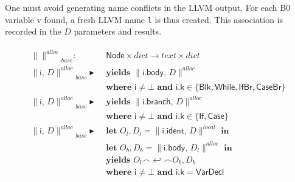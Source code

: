 \documentclass{article}
\newcommand{\trad}[2]{\ensuremath{\lVert \textsf{#1} \rVert^{\textit{#2}}}}
\newcommand{\nl}[0]{\ensuremath{\hookleftarrow}}
\DeclareMathOperator{\conc}{\smallfrown}
\DeclareMathOperator{\isdef}{\blacktriangleright}
\begin{document}
One must avoid generating name conflicts in the LLVM output. For each
B0 variable \textsf{v} found, a fresh LLVM name \texttt{l} is thus
created. This association is recorded in the $D$ parameters and results.
\begin{framed}
  \begin{align}
\begin{split}
    \trad{}{alloc}_{base} : & \textsf{ Node} \times dict \rightarrow text \times dict \\
    \trad{i, $D$}{alloc}_{base} \isdef 
    & \textbf{ yields } \trad{i.body, $D$}{alloc}  \\
    & \textbf{ where } \textsf{i} \ne \bot \textbf{ and } \textsf{i.k} \in \{\textsf{Blk}, \textsf{While}, \textsf{IfBr}, \textsf{CaseBr} \}  \\
    \trad{i, $D$}{alloc}_{base} \isdef 
    & \textbf{ yields } \trad{i.branch, $D$}{alloc}  \\
    & \textbf{ where } \textsf{i} \ne \bot \textbf{ and } \textsf{i.k} \in \{\textsf{If}, \textsf{Case} \}  \\
    \trad{i, $D$}{alloc}_{base} \isdef 
    & \textbf{ let } O_l, D_l = \trad{i.ident, $D$}{local} \textbf{ in}  \\
    & \textbf{ let } O_b, D_b = \trad{i.body, $D_l$}{alloc} \textbf{ in}  \\
    & \textbf{ yields } O_l \conc \nl \conc O_b, D_b  \\
    & \textbf{ where } \textsf{i} \ne \bot \textbf{ and } \textsf{i.k} = \textsf{VarDecl} 
  \end{split}
\end{align}
\end{framed}
\end{document}
